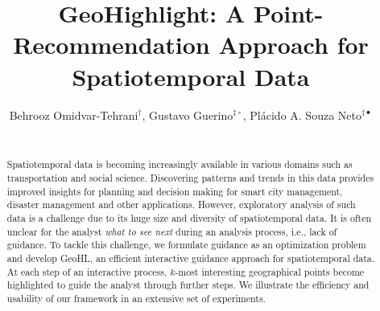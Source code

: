 \documentclass{sig-alternate-05-2015}
\begin{document}




\newtheorem{problem}{Problem}
\newtheorem{definition}{Definition}
\newtheorem{example}{Example}

\newcommand{\framework}{{\sc GeoHL}}
\newcommand{\pb}{{\sc GeoGuide}}

 





\title{GeoHighlight: A Point-Recommendation Approach for Spatiotemporal Data}



\author{
Behrooz Omidvar-Tehrani$^{\dag}$, Gustavo Guerino$^{\ddag \circ}$, Pl\'acido A. Souza Neto$^{\ddag \bullet}$\\
\\
}


\maketitle
\begin{abstract}
Spatiotemporal data is becoming increasingly available in various domains such as transportation and social science. Discovering patterns and trends in this data provides improved insights for planning and decision making for smart city management, disaster management and other applications. However, exploratory analysis of such data is a challenge due to its huge size and diversity of spatiotemporal data. It is often unclear for the analyst {\em what to see next} during an analysis process, i.e., lack of guidance. To tackle this challenge, we formulate guidance as an optimization problem and develop \framework, an efficient interactive guidance approach for spatiotemporal data. At each step of an interactive process, $k$-most interesting geographical points become highlighted to guide the analyst through further steps. We illustrate the efficiency and usability of our framework in an extensive set of experiments.
\end{abstract}








% 




 
\end{document}
